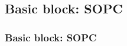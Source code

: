 \subsection{Basic block: SOPC}
\begin{frame}
	\frametitle{Basic block: SOPC}
%
%
%
%    
%


\end{frame}
